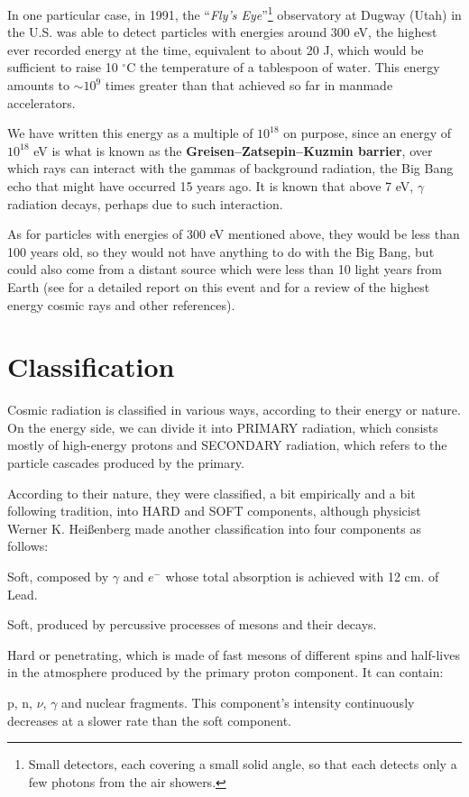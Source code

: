 In one particular case, in 1991, the \enquote{\textit{Fly's Eye}}\footnote{Small detectors, each covering a small solid angle, so that each detects only a few photons from the air showers.} observatory at Dugway (Utah) in the U.S. was able to detect particles with energies around 300 eV, the highest ever recorded energy at the time, equivalent to about 20 J, which would be sufficient to raise 10 $^{\circ}$C the temperature of a tablespoon of water. This energy amounts to $\sim 10^9$ times greater than that achieved so far in manmade accelerators.

We have written this energy as a multiple of $10^{18}$ on purpose, since an energy of $10^{18}$ eV is what is known as the \textbf{Greisen--Zatsepin--Kuzmin barrier}, over which rays can interact with the gammas of background radiation, the Big Bang echo that might have occurred 15 years ago. It is known that above 7 eV, $\gamma$ radiation decays, perhaps due to such interaction.

As for particles with energies of 300 eV mentioned above, they would be less than 100 years old, so they would not have anything to do with the Big Bang, but could also come from a distant source which were less than 10 light years from Earth (see \cite{bir:95} for a detailed report on this event and \cite{hal:98} for a review of the highest energy cosmic rays and other references).

	\section{Classification}

	Cosmic radiation is classified in various ways, according to their energy or nature. On the energy side, we can divide it into PRIMARY radiation, which consists mostly of high-energy protons and SECONDARY radiation, which refers to the particle cascades produced by the primary.

According to their nature, they were classified, a bit empirically and a bit following tradition, into HARD and SOFT components, although physicist Werner K. Hei\ss enberg made ​​another classification into four components as follows:

\ben
	\item Soft, composed by $\gamma$ and $e^-$ whose total absorption is achieved with 12 cm. of Lead.
	\item Soft, produced by percussive processes of mesons and their decays.
	\item Hard or penetrating, which is made of fast mesons of different spins and half-lives in the atmosphere produced by the primary proton component. It can contain:
	\item p, n, $\nu$, $\gamma$ and nuclear fragments. This component's intensity continuously decreases at a slower rate than the soft component.
\een

